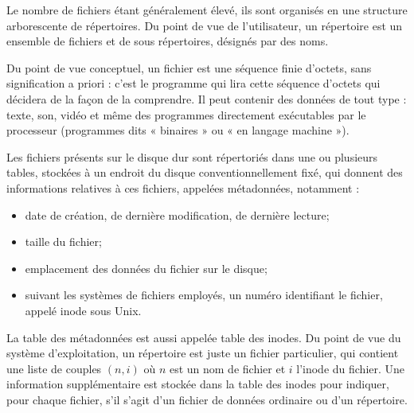 \documentclass[11pt,oneside]{article}
\begin{document}
Le nombre de fichiers étant généralement élevé, ils sont organisés en une structure arborescente
de répertoires. Du point de vue de l'utilisateur, un répertoire est un ensemble de fichiers et de sous répertoires, désignés par des noms.
%
%
%

Du point de vue conceptuel, un fichier est une séquence finie d'octets, sans signification
a priori : c'est le programme qui lira cette séquence d'octets qui décidera de la façon de
la comprendre. Il peut contenir des données de tout type : texte, son, vidéo et même des
programmes directement exécutables par le processeur (programmes dits « binaires » ou
« en langage machine »).

Les fichiers présents sur le disque dur sont répertoriés dans une ou plusieurs tables, stockées
à un endroit du disque conventionnellement fixé, qui donnent des informations relatives
à ces fichiers, appelées métadonnées, notamment :
\begin{itemize}
\item date de création, de dernière modification, de dernière lecture;
\item taille du fichier;
\item emplacement des données du fichier sur le disque;
\item suivant les systèmes de fichiers employés, un numéro identifiant le fichier, appelé
inode sous Unix.
\end{itemize}

La table des métadonnées est aussi appelée table des inodes. Du point de vue du système d'exploitation, un répertoire est juste un fichier particulier,
qui contient une liste de couples $(n, i)$ où $n$ est un nom de fichier et $i$ l'inode du fichier.
Une information supplémentaire est stockée dans la table des inodes pour indiquer, pour
chaque fichier, s'il s'agit d'un fichier de données ordinaire ou d'un répertoire.
\end{document}
